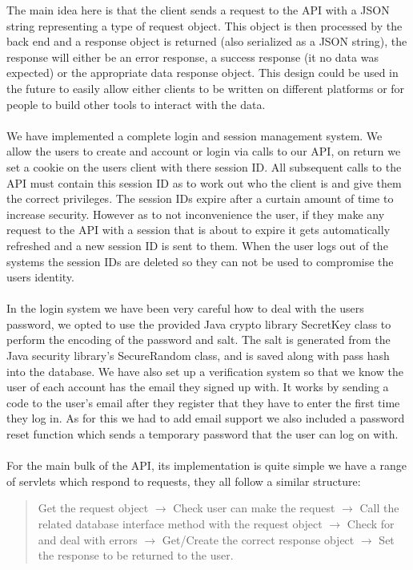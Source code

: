 \documentclass[10pt,a4paper]{article}
\begin{document}
The main idea here is that the client sends a request to the API with a JSON string representing a type of request object. This object is then processed by the back end and a response object is returned (also serialized as a JSON string), the response will either be an error response, a success response (it no data was expected) or the appropriate data response object. This design could be used in the future to easily allow either clients to be written on different platforms or for people to build other tools to interact with the data. 
\\
\\
\noindent We have implemented a complete login and session management system. We allow the users to create and account or login via calls to our API, on return we set a cookie on the users client with there session ID. All subsequent calls to the API must contain this session ID as to work out who the client is and give them the correct privileges. The session IDs expire after a curtain amount of time to increase security. However as to not inconvenience the user, if they make any request to the API with a session that is about to expire it gets automatically refreshed and a new session ID is sent to them. When the user logs out of the systems the session IDs are deleted so they can not be used to compromise the users identity.
\\
\\
\noindent In the login system we have been very careful how to deal with the users password, we opted to use the provided Java crypto library SecretKey class to perform the encoding of the password and salt. The salt is generated from the Java security library’s SecureRandom class, and is saved along with pass hash into the database. We have also set up a verification system so that we know the user of each account has the email they signed up with. It works by sending a code to the user's email after they register that they have to enter the first time they log in. As for this we had to add email support we also included a password reset function which sends a temporary password that the user can log on with.  
\\
\\
\noindent For the main bulk of the API, its implementation is quite simple we have a range of servlets which respond to requests, they all follow a similar structure:
\begin{quote}
\centering
Get the request object $\rightarrow$ Check user can make the request $\rightarrow$ Call the related database interface method with the request object $\rightarrow$ Check for and deal with errors $\rightarrow$ Get/Create the correct response object $\rightarrow$ Set the response to be returned to the user.
\end{quote}
\end{document}
